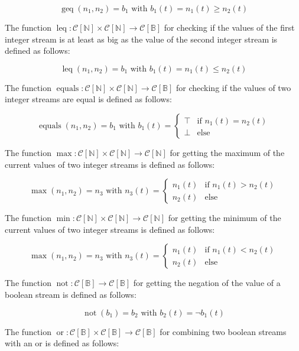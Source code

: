 \[\operatorname{geq}(n_1,n_2) = b_1 \text{ with } b_1(t) = n_1(t) \geq n_2(t)\]

The function $\operatorname{leq}: \mathcal{C}[\mathbb{N}] \times \mathcal{C}[\mathbb{N}] \rightarrow \mathcal{C}[\mathbb{B}]$ for checking if the values of the first integer stream is at least as big as the value of the second integer stream is defined as follows:

\[\operatorname{leq}(n_1,n_2) = b_1 \text{ with } b_1(t) = n_1(t) \leq n_2(t)\]

The function $\operatorname{equals}: \mathcal{C}[\mathbb{N}] \times \mathcal{C}[\mathbb{N}] \rightarrow \mathcal{C}[\mathbb{B}]$ for checking if the values of two integer streams are equal is defined as follows:

\[\operatorname{equals}(n_1,n_2) = b_1 \text{ with } b_1(t) = \begin{cases}
\top & \text{if } n_1(t) = n_2(t) \\
\bot & \text{else}
\end{cases}\]

The function $\operatorname{max}: \mathcal{C}[\mathbb{N}] \times \mathcal{C}[\mathbb{N}] \rightarrow \mathcal{C}[\mathbb{N}]$ for getting the maximum of the current values of two integer streams is defined as follows:

\[\operatorname{max}(n_1,n_2) = n_3 \text{ with } n_3(t) = \begin{cases}
n_1(t) & \text{if } n_1(t) > n_2(t) \\
n_2(t) & \text{else}
\end{cases}\]

The function $\operatorname{min}: \mathcal{C}[\mathbb{N}] \times \mathcal{C}[\mathbb{N}] \rightarrow \mathcal{C}[\mathbb{N}]$ for getting the minimum of the current values of two integer streams is defined as follows:

\[\operatorname{max}(n_1,n_2) = n_3 \text{ with } n_3(t) = \begin{cases}
n_1(t) & \text{if } n_1(t) < n_2(t) \\
n_2(t) & \text{else}
\end{cases}\]

The function $\operatorname{not}: \mathcal{C}[\mathbb{B}] \rightarrow \mathcal{C}[\mathbb{B}]$ for getting the negation of the value of a boolean stream is defined as follows:

\[\operatorname{not}(b_1) = b_2 \text{ with } b_2(t) = \neg b_1(t)\]

The function $\operatorname{or}: \mathcal{C}[\mathbb{B}] \times \mathcal{C}[\mathbb{B}] \rightarrow \mathcal{C}[\mathbb{B}]$ for combining two boolean streams with an or is defined as follows:

